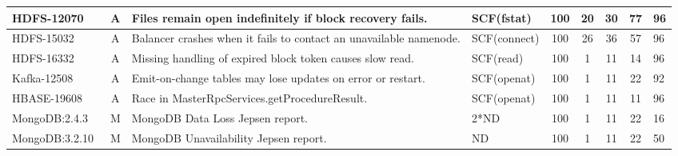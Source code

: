 \begin{table*}[t!]
\begin{tabular}{l|c|l|l|c|c|c|c|l}
		HDFS-12070~\cite{hdfs12070}                                                                                                 & A            & Files remain open indefinitely if block recovery fails.                 & SCF(fstat)                                                              & 100             & 20             & 30           & 77                & 96            \\ \hline
		HDFS-15032~\cite{hdfs15032}                                                                                                 & A            & Balancer crashes when it fails to contact an unavailable namenode.      & SCF(connect)                                                            & 100             & 26             & 36           & 57                & 96            \\ \hline
		HDFS-16332~\cite{hdfs16332}                                                                                                 & A            & Missing handling of expired block token causes slow read.               & SCF(read)                                                               & 100             & 1              & 11           & 14                & 96            \\ \hline
		Kafka-12508~\cite{kafka12508}                                                                                               & A            & Emit-on-change tables may lose updates on error or restart.             & SCF(openat)                                                             & 100             & 1              & 11           & 22                & 92            \\ \hline
		HBASE-19608~\cite{hbase19608}                                                                                               & A            & Race in MasterRpcServices.getProcedureResult.                           & SCF(openat)                                                             & 100             & 1              & 11           & 11                & 96            \\ \hline
		MongoDB:2.4.3~\cite{mongo-2-4-3}                                                                                            & M            & MongoDB Data Loss Jepsen report.                                        & 2*ND                                                                    & 100             & 1              & 11           & 22                & 16            \\ \hline
		MongoDB:3.2.10~\cite{mongo-3-2-10}                                                                                          & M            & MongoDB Unavailability Jepsen report.                                   & ND                                                                      & 100             & 1              & 11           & 22                & 50            \\ \hline

\end{tabular}
\end{table*}
